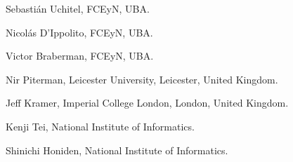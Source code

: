 \item Sebasti\'an Uchitel, FCEyN, UBA.
\item Nicol\'as D'Ippolito, FCEyN, UBA.
\item Victor Braberman, FCEyN, UBA.
\item Nir Piterman, Leicester University, Leicester, United Kingdom.
\item Jeff Kramer, Imperial College London, London, United Kingdom.
\item Kenji Tei, National Institute of Informatics.
\item Shinichi Honiden, National Institute of Informatics.

